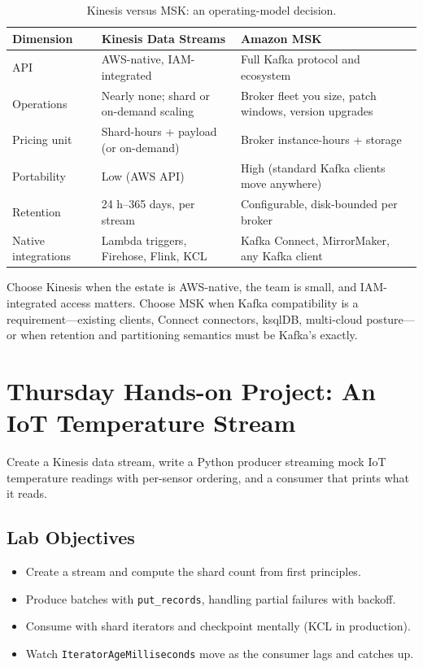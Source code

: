 \begin{table}[H]
\centering
\small
\begin{tabular}{@{}p{3.2cm}p{4.5cm}p{4.7cm}@{}}
\toprule
\textbf{Dimension} & \textbf{Kinesis Data Streams} & \textbf{Amazon MSK} \\
\midrule
API & AWS-native, IAM-integrated & Full Kafka protocol and ecosystem \\
Operations & Nearly none; shard or on-demand scaling & Broker fleet you size, patch windows, version upgrades \\
Pricing unit & Shard-hours + payload (or on-demand) & Broker instance-hours + storage \\
Portability & Low (AWS API) & High (standard Kafka clients move anywhere) \\
Retention & 24 h--365 days, per stream & Configurable, disk-bounded per broker \\
Native integrations & Lambda triggers, Firehose, Flink, KCL & Kafka Connect, MirrorMaker, any Kafka client \\
\bottomrule
\end{tabular}
\caption{Kinesis versus MSK: an operating-model decision.}
\label{tab:ch13-kinesis-msk}
\end{table}

Choose Kinesis when the estate is AWS-native, the team is small, and IAM-integrated access matters. Choose MSK when Kafka compatibility is a requirement---existing clients, Connect connectors, ksqlDB, multi-cloud posture---or when retention and partitioning semantics must be Kafka's exactly.

\section{Thursday Hands-on Project: An IoT Temperature Stream}
Create a Kinesis data stream, write a Python producer streaming mock IoT temperature readings with per-sensor ordering, and a consumer that prints what it reads.

\subsection*{Lab Objectives}
\begin{itemize}
    \item Create a stream and compute the shard count from first principles.
    \item Produce batches with \texttt{put\_records}, handling partial failures with backoff.
    \item Consume with shard iterators and checkpoint mentally (KCL in production).
    \item Watch \texttt{IteratorAgeMilliseconds} move as the consumer lags and catches up.
\end{itemize}

